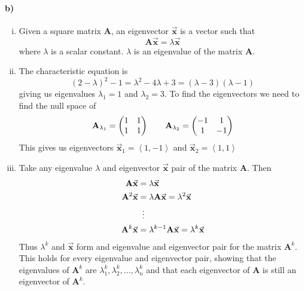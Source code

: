 \documentclass[12pt]{article}
\begin{document}
\paragraph{b)}

\begin{enumerate}[i)]
        \item Given a square matrix \(\mathbf{A}\), an eigenvector \(\vec{\mathbf{x}}\) is a vector such that
                \[\mathbf{A}\vec{\mathbf{x}}=\lambda\vec{\mathbf{x}}\]
                where \(\lambda\) is a scalar constant. \(\lambda\) is an eigenvalue of the matrix \(\mathbf{A}\).
        \item The characteristic equation is
                \[(2-\lambda)^2-1=\lambda^2-4\lambda+3=(\lambda-3)(\lambda-1)\]
                giving us eigenvalues \(\lambda_1=1\) and \(\lambda_2=3\). To find the eigenvectors we need to find the null space of
                \[\mathbf{A}_{\lambda_1}=\left(
                        \begin{array}{@{}cc@{}}
                                1&1\\
                                1&1
                        \end{array}
                \right)
                \qquad
                \mathbf{A}_{\lambda_2}=\left(
                        \begin{array}{@{}cc@{}}
                                -1&1\\
                                1&-1
                        \end{array}
                \right)\]
                This gives us eigenvectors \(\vec{\mathbf{x}}_1=\left<1,-1\right>\) and \(\vec{\mathbf{x}}_2=\left<1,1\right>\)
        \item Take any eigenvalue \(\lambda\) and eigenvector \(\vec{\mathbf{x}}\) pair of the matrix \(\mathbf{A}\). Then
                \begin{align*}
                        \mathbf{A}\vec{\mathbf{x}}&=\lambda\vec{\mathbf{x}}\\
                        \mathbf{A}^2\vec{\mathbf{x}}&=\lambda\mathbf{A}\vec{\mathbf{x}}=\lambda^2\vec{\mathbf{x}}\\
                        &\mathrel{\makebox[\widthof{=}]{\vdots}}\\
                        \mathbf{A}^k\vec{\mathbf{x}}&=\lambda^{k-1}\mathbf{A}\vec{\mathbf{x}}=\lambda^k\vec{\mathbf{x}}
                \end{align*}
                Thus \(\lambda^k\) and \(\vec{\mathbf{x}}\) form and eigenvalue and eigenvector pair for the matrix \(\mathbf{A}^k\). This
                holds for every eigenvalue and eigenvector pair, showing that the eigenvalues of \(\mathbf{A}^k\) are \(\lambda_1^k,\lambda_2^k,\ldots,\lambda_n^k\)
                and that each eigenvector of \(\mathbf{A}\) is still an eigenvector of \(\mathbf{A}^k\).
\end{enumerate}
\end{document}

